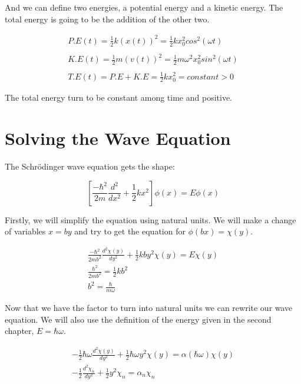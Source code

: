 And we can define two energies, a potential energy and a kinetic energy. The total energy is going to be the addition of the other two.

\begin{equation}
  \begin{array}{c}
    P.E(t) = \frac{1}{2} k (x(t))^2 = \frac{1}{2} k x_0^2 cos^2(\omega t)
    \\

    \\
    K.E(t) = \frac{1}{2} m (v(t))^2 = \frac{1}{2} m \omega^2 x_0^2 sin^2(\omega t)
    \\

    \\
    T.E(t) = P.E + K.E = \frac{1}{2} k x_0^2 = constant > 0
  \end{array}
\end{equation}

The total energy turn to be constant among time and positive.

\section{Solving the Wave Equation}

The Schrödinger wave equation gets the shape:

\begin{equation}
  \left[\frac{-\hbar^2}{2m}\frac{d^2}{dx^2}+\frac{1}{2}kx^2\right]\phi(x) = E \phi(x)
\end{equation}

Firstly, we will simplify the equation using natural units. We will make a change of variables $x=by$ and try to get the equation for $\phi(bx)=\chi(y)$.

\begin{equation}
  \begin{array}{c}
    \frac{-\hbar^2}{2mb^2}\frac{d^2\chi(y)}{dy^2}+\frac{1}{2}kby^2\chi(y) = E\chi(y)
    \\
    \frac{\hbar^2}{2mb^2} = \frac{1}{2}k b^2
    \\
    b^2 = \frac{\hbar}{m\omega}
  \end{array}
\end{equation}

Now that we have the factor to turn into natural units we can rewrite our wave equation. We will also use the definition of the energy given in the second chapter, $E=\hbar \omega$.

\begin{equation}
  \begin{array}{c}
    -\frac{1}{2}\hbar \omega \frac{d^2\chi(y)}{dy^2} + \frac{1}{2} \hbar \omega y^2 \chi(y) = \alpha(\hbar\omega)\chi(y)
    \\
    -\frac{1}{2}\frac{d^2\chi_n}{dy^2}+\frac{1}{2}y^2\chi_n = \alpha_n \chi_n
  \end{array}
\end{equation}

